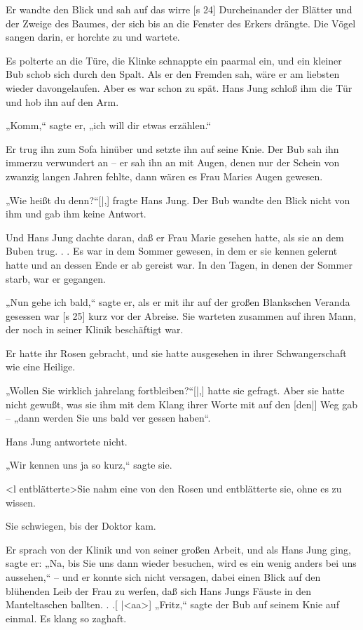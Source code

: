 Er wandte den Blick und sah auf das wirre
[s 24]
Durcheinander der Blätter und der Zweige des
Baumes, der sich bis an die Fenster des Erkers drängte.
Die Vögel sangen darin, er horchte zu und wartete.

Es polterte an die Türe, die Klinke schnappte
ein paarmal ein, und ein kleiner Bub schob sich
durch den Spalt. Als er den Fremden sah, wäre
er am liebsten wieder davongelaufen. Aber es
war schon zu spät. Hans Jung schloß ihm die Tür
und hob ihn auf den Arm.

„Komm,“ sagte er, „ich will dir etwas erzählen.“

Er trug ihn zum Sofa hinüber und setzte
ihn auf seine Knie. Der Bub sah ihn immerzu
verwundert an – er sah ihn an mit Augen, denen
nur der Schein von zwanzig langen Jahren fehlte,
dann wären es Frau Maries Augen gewesen.

„Wie heißt du denn?“[|,] fragte Hans Jung. Der
Bub wandte den Blick nicht von ihm und gab ihm
keine Antwort.

Und Hans Jung dachte daran, daß er Frau
Marie gesehen hatte, als sie an dem Buben trug. . .
Es war in dem Sommer gewesen, in dem er sie
kennen gelernt hatte und an dessen Ende er ab­
gereist war. In den Tagen, in denen der Sommer
starb, war er gegangen.

„Nun gehe ich bald,“ sagte er, als er mit ihr
auf der großen Blankschen Veranda gesessen war
[s 25]
kurz vor der Abreise. Sie warteten zusammen auf
ihren Mann, der noch in seiner Klinik beschäftigt war.

Er hatte ihr Rosen gebracht, und sie hatte
ausgesehen in ihrer Schwangerschaft wie eine Heilige.

„Wollen Sie wirklich jahrelang fortbleiben?“[|,]
hatte sie gefragt. Aber sie hatte nicht gewußt, was
sie ihm mit dem Klang ihrer Worte mit auf den
[den|] Weg gab – „dann werden Sie uns bald ver­
gessen haben“.

Hans Jung antwortete nicht.

„Wir kennen uns ja so kurz,“ sagte sie.

<l entblätterte>Sie nahm eine von den Rosen und entblätterte
sie, ohne es zu wissen.

Sie schwiegen, bis der Doktor kam.

Er sprach von der Klinik und von seiner großen
Arbeit, und als Hans Jung ging, sagte er: „Na, bis
Sie uns dann wieder besuchen, wird es ein wenig
anders bei uns aussehen,“ – und er konnte sich
nicht versagen, dabei einen Blick auf den blühenden
Leib der Frau zu werfen, daß sich Hans Jungs Fäuste
in den Manteltaschen ballten. . .[
|<aa>]
„Fritz,“ sagte der Bub auf seinem Knie auf
einmal. Es klang so zaghaft.

